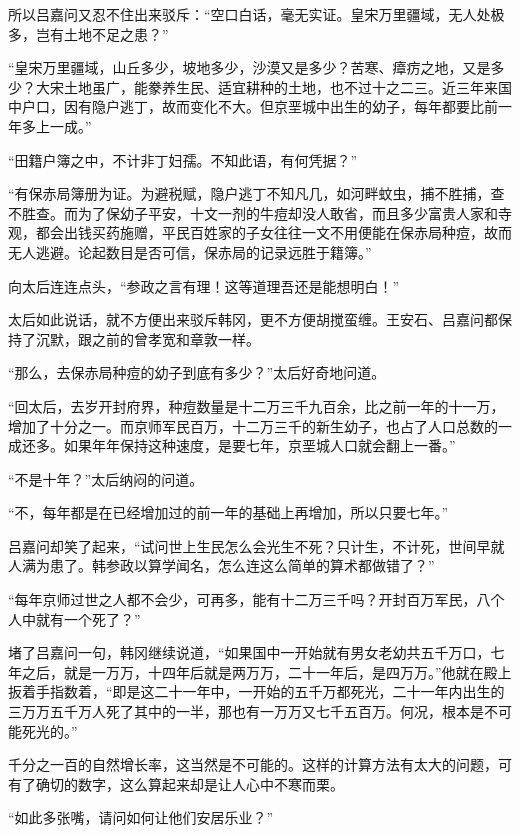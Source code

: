 所以吕嘉问又忍不住出来驳斥：“空口白话，毫无实证。皇宋万里疆域，无人处极多，岂有土地不足之患？”

“皇宋万里疆域，山丘多少，坡地多少，沙漠又是多少？苦寒、瘴疠之地，又是多少？大宋土地虽广，能豢养生民、适宜耕种的土地，也不过十之二三。近三年来国中户口，因有隐户逃丁，故而变化不大。但京垩城中出生的幼子，每年都要比前一年多上一成。”

“田籍户簿之中，不计非丁妇孺。不知此语，有何凭据？”

“有保赤局簿册为证。为避税赋，隐户逃丁不知凡几，如河畔蚊虫，捕不胜捕，查不胜查。而为了保幼子平安，十文一剂的牛痘却没人敢省，而且多少富贵人家和寺观，都会出钱买药施赠，平民百姓家的子女往往一文不用便能在保赤局种痘，故而无人逃避。论起数目是否可信，保赤局的记录远胜于籍簿。”

向太后连连点头，“参政之言有理！这等道理吾还是能想明白！”

太后如此说话，就不方便出来驳斥韩冈，更不方便胡搅蛮缠。王安石、吕嘉问都保持了沉默，跟之前的曾孝宽和章敦一样。

“那么，去保赤局种痘的幼子到底有多少？”太后好奇地问道。

“回太后，去岁开封府界，种痘数量是十二万三千九百余，比之前一年的十一万，增加了十分之一。而京师军民百万，十二万三千的新生幼子，也占了人口总数的一成还多。如果年年保持这种速度，是要七年，京垩城人口就会翻上一番。”

“不是十年？”太后纳闷的问道。

“不，每年都是在已经增加过的前一年的基础上再增加，所以只要七年。”

吕嘉问却笑了起来，“试问世上生民怎么会光生不死？只计生，不计死，世间早就人满为患了。韩参政以算学闻名，怎么连这么简单的算术都做错了？”

“每年京师过世之人都不会少，可再多，能有十二万三千吗？开封百万军民，八个人中就有一个死了？”

堵了吕嘉问一句，韩冈继续说道，“如果国中一开始就有男女老幼共五千万口，七年之后，就是一万万，十四年后就是两万万，二十一年后，是四万万。”他就在殿上扳着手指数着，“即是这二十一年中，一开始的五千万都死光，二十一年内出生的三万万五千万人死了其中的一半，那也有一万万又七千五百万。何况，根本是不可能死光的。”

千分之一百的自然增长率，这当然是不可能的。这样的计算方法有太大的问题，可有了确切的数字，这么算起来却是让人心中不寒而栗。

“如此多张嘴，请问如何让他们安居乐业？”
